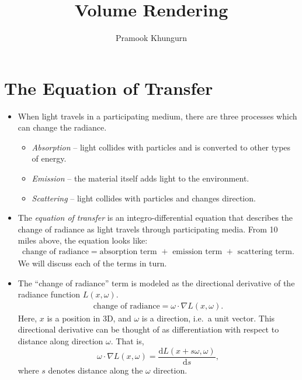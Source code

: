 \documentclass[10pt]{article}
\title{Volume Rendering}
\author{Pramook Khungurn}
\newcommand{\dee}{\mathrm{d}}
\begin{document}
	\maketitle
	
	\section{The Equation of Transfer} %
	\label{sec:the_equation_of_transfer}
	
	\begin{itemize}
		\item When light travels in a participating medium, there are three processes which can change the radiance.
			
			\begin{itemize}
				\item \emph{Absorption} -- light collides with particles and is converted to other types of energy.
				\item \emph{Emission} -- the material itself adds light to the environment.
				\item \emph{Scattering} -- light collides with particles and changes direction.
			\end{itemize}
		
		\item The \emph{equation of transfer} is an integro-differential equation that describes the change of 
			radiance as light travels through participating media. From 10 miles above, the equation looks like:			
			\begin{align}
				\mbox{change of radiance} = \mbox{absorption term } + \mbox{ emission term } + \mbox{ scattering term}.
			\end{align}
			We will discuss each of the terms in turn.
		
		\item The ``change of radiance'' term is modeled as the directional derivative of the radiance function
			$L(x, \omega)$. 
			\begin{align*}
				\mbox{change of radiance} = \omega \cdot \nabla L(x, \omega).
			\end{align*}
			Here, $x$ is a position in 3D, and $\omega$ is a direction, i.e.~a unit vector.
			This directional derivative can be thought of as differentiation with respect to 
			distance along direction $\omega$. That is,
			$$\omega \cdot \nabla L(x,\omega) = \frac{\dee L(x + s\omega,\omega)}{\dee s},$$
			where $s$ denotes distance along the $\omega$ direction.
			

\end{itemize}
\end{document}
